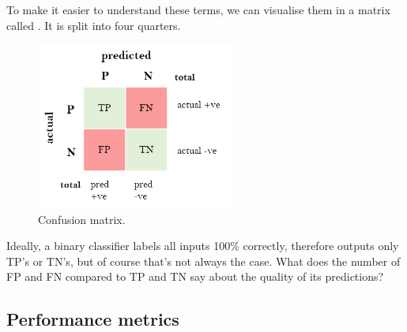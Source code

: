 \documentclass[a4paper]{article}
\begin{document}
To make it easier to understand these terms, we can visualise them in a matrix called . It is split into four quarters.

\begin{figure}[H]
    \centering
    \includegraphics[height=5.5cm]{img/conf_matrix.png}
    \caption{Confusion matrix.}
\end{figure}

Ideally, a binary classifier labels all inputs 100\% correctly, therefore outputs only TP's or TN's, but of course that's not always the case. What does the number of FP and FN compared to TP and TN say about the quality of its predictions?



\subsection{Performance metrics}
\end{document}
